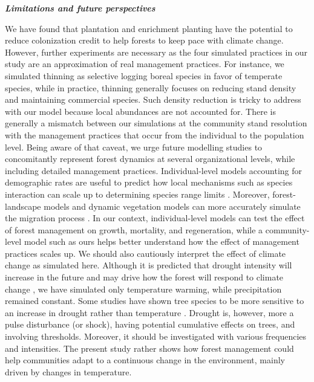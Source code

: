 \textbf{\emph{Limitations and future perspectives}}

We have found that plantation and enrichment planting have the potential
to reduce colonization credit to help forests to keep pace with climate
change. However, further experiments are necessary as the four simulated
practices in our study are an approximation of real management
practices. For instance, we simulated thinning as selective logging
boreal species in favor of temperate species, while in practice,
thinning generally focuses on reducing stand density and maintaining
commercial species. Such density reduction is tricky to address with our
model because local abundances are not accounted for. There is generally
a mismatch between our simulations at the community stand resolution
with the management practices that occur from the individual to the
population level. Being aware of that caveat, we urge future modelling
studies to concomitantly represent forest dynamics at several
organizational levels, while including detailed management practices.
Individual-level models accounting for demographic rates are useful to
predict how local mechanisms such as species interaction can scale up to
determining species range limits
\citep{Araujo2014a, Normand2014, Snell2014}. Moreover, forest-landscape
models and dynamic vegetation models can more accurately simulate the
migration process \citep{Lehsten2019}. In our context, individual-level
models can test the effect of forest management on growth, mortality,
and regeneration, while a community-level model such as ours helps
better understand how the effect of management practices scales up. We
should also cautiously interpret the effect of climate change as
simulated here. Although it is predicted that drought intensity will
increase in the future and may drive how the forest will respond to
climate change \citep{Greenwood2017}, we have simulated only temperature
warming, while precipitation remained constant. Some studies have shown
tree species to be more sensitive to an increase in drought rather than
temperature \citep[\emph{e.g.} white spruce][]{Andalo2005}. Drought is,
however, more a pulse disturbance (or shock), having potential
cumulative effects on trees, and involving thresholds. Moreover, it
should be investigated with various frequencies and intensities. The
present study rather shows how forest management could help communities
adapt to a continuous change in the environment, mainly driven by
changes in temperature.

